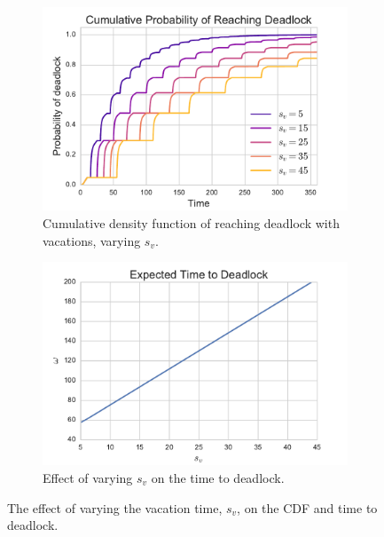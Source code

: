 \documentclass{article}
\begin{document}
\begin{figure}
\begin{center}
\begin{subfigure}[b]{0.45\textwidth}
    \includegraphics[width=\textwidth]{img/cdf_vary_sv.pdf}
    \caption{Cumulative density function of reaching deadlock with vacations, varying $s_v$.}
    \label{fig:cdf_varysv}
\end{subfigure}
\begin{subfigure}[b]{0.45\textwidth}
    \includegraphics[width=\textwidth]{img/ttd_vary_sv.pdf}
    \caption{Effect of varying $s_v$ on the time to deadlock.}
    \label{fig:ttd_varysv}
\end{subfigure}
\end{center}
\caption{The effect of varying the vacation time, $s_v$, on the CDF and time to deadlock.}
\label{fig:ttdcdf_varysv}
\end{figure}
\end{document}
